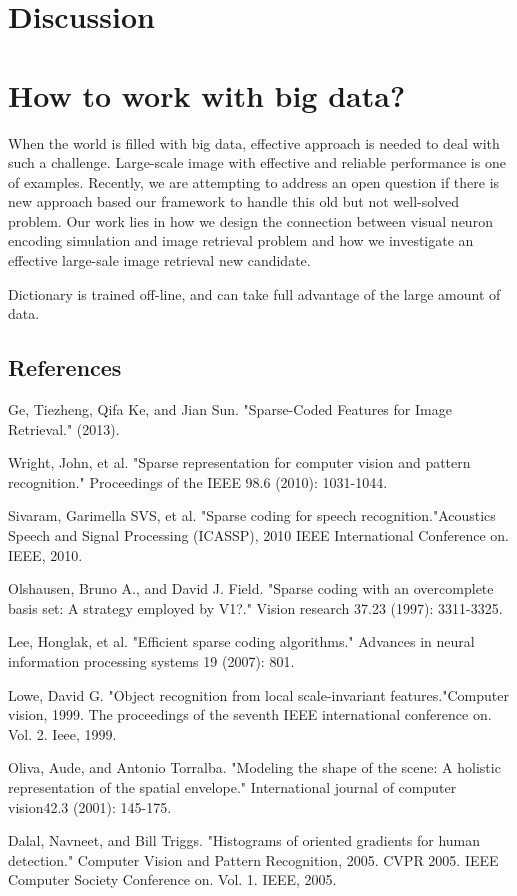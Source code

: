 \documentclass[letterpaper]{article}
\begin{document}
\section{Discussion}


\section{How to work with big data?}
When the world is filled with big data, effective approach is needed to deal with such a challenge.  Large-scale image with effective and reliable performance is one of examples. Recently, we are attempting to address an open question if there is new approach based our framework to handle this old but not well-solved problem. Our work lies in how we design the connection between visual neuron encoding simulation and image retrieval problem and how we investigate an effective large-sale image retrieval new candidate.

Dictionary is trained off-line, and can take full advantage of the large amount of data.
\subsection{References} 
Ge, Tiezheng, Qifa Ke, and Jian Sun. "Sparse-Coded Features for Image Retrieval." (2013).

Wright, John, et al. "Sparse representation for computer vision and pattern recognition." Proceedings of the IEEE 98.6 (2010): 1031-1044.

Sivaram, Garimella SVS, et al. "Sparse coding for speech recognition."Acoustics Speech and Signal Processing (ICASSP), 2010 IEEE International Conference on. IEEE, 2010.

Olshausen, Bruno A., and David J. Field. "Sparse coding with an overcomplete basis set: A strategy employed by V1?." Vision research 37.23 (1997): 3311-3325.

Lee, Honglak, et al. "Efficient sparse coding algorithms." Advances in neural information processing systems 19 (2007): 801.

Lowe, David G. "Object recognition from local scale-invariant features."Computer vision, 1999. The proceedings of the seventh IEEE international conference on. Vol. 2. Ieee, 1999.

Oliva, Aude, and Antonio Torralba. "Modeling the shape of the scene: A holistic representation of the spatial envelope." International journal of computer vision42.3 (2001): 145-175.

Dalal, Navneet, and Bill Triggs. "Histograms of oriented gradients for human detection." Computer Vision and Pattern Recognition, 2005. CVPR 2005. IEEE Computer Society Conference on. Vol. 1. IEEE, 2005.
\end{document}
